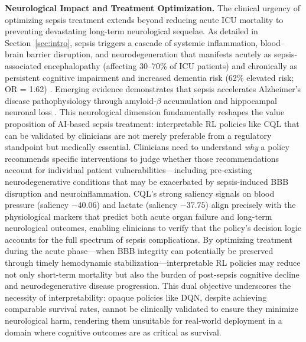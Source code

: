 \textbf{Neurological Impact and Treatment Optimization.} The clinical urgency of optimizing sepsis treatment extends beyond reducing acute ICU mortality to preventing devastating long-term neurological sequelae. As detailed in Section~\ref{sec:intro}, sepsis triggers a cascade of systemic inflammation, blood--brain barrier disruption, and neurodegeneration that manifests acutely as sepsis-associated encephalopathy (affecting 30--70\% of ICU patients) and chronically as persistent cognitive impairment and increased dementia risk (62\% elevated risk; OR = 1.62) \citep{yang2022dementia_risk_sepsis, barichello2020bbb_sepsis, iwashyna2010longterm_cognitive}. Emerging evidence demonstrates that sepsis accelerates Alzheimer's disease pathophysiology through amyloid-$\beta$ accumulation and hippocampal neuronal loss \citep{yang2023sepsis_alzheimers}. This neurological dimension fundamentally reshapes the value proposition of AI-based sepsis treatment: interpretable RL policies like CQL that can be validated by clinicians are not merely preferable from a regulatory standpoint but medically essential. Clinicians need to understand \textit{why} a policy recommends specific interventions to judge whether those recommendations account for individual patient vulnerabilities—including pre-existing neurodegenerative conditions that may be exacerbated by sepsis-induced BBB disruption and neuroinflammation. CQL's strong saliency signals on blood pressure (saliency $-40.06$) and lactate (saliency $-37.75$) align precisely with the physiological markers that predict both acute organ failure and long-term neurological outcomes, enabling clinicians to verify that the policy's decision logic accounts for the full spectrum of sepsis complications. By optimizing treatment during the acute phase—when BBB integrity can potentially be preserved through timely hemodynamic stabilization—interpretable RL policies may reduce not only short-term mortality but also the burden of post-sepsis cognitive decline and neurodegenerative disease progression. This dual objective underscores the necessity of interpretability: opaque policies like DQN, despite achieving comparable survival rates, cannot be clinically validated to ensure they minimize neurological harm, rendering them unsuitable for real-world deployment in a domain where cognitive outcomes are as critical as survival.

